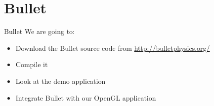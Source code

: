 \part{Bullet}
\frame{\partpage}

\begin{frame}{Bullet}
	We are going to:
	\begin{itemize}
		\item Download the Bullet source code from \url{http://bulletphysics.org/}
		\item Compile it
		\item Look at the demo application
		\item Integrate Bullet with our OpenGL application
	\end{itemize}
\end{frame}

